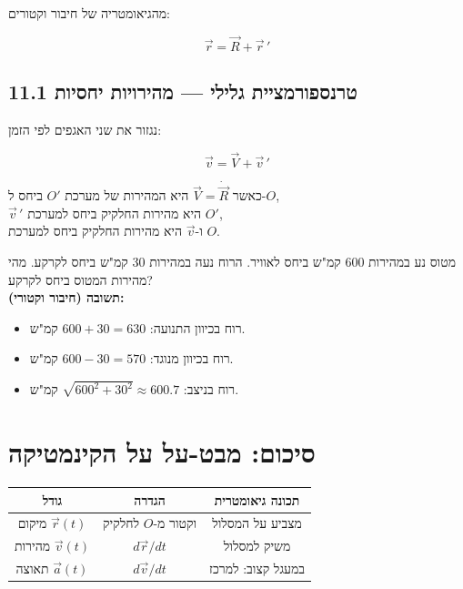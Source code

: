 \documentclass[12pt, a4paper]{article}
\newcommand{\hvec}[1]{\overrightarrow{#1}}
\begin{document}
מהגיאומטריה של חיבור וקטורים:

\begin{tcolorbox}[resultbox]
\[
  \hvec{r} = \hvec{R} + \hvec{r}\,'
\]
\end{tcolorbox}

\subsection*{11.1 טרנספורמציית גלילי --- מהירויות יחסיות}

נגזור את שני האגפים לפי הזמן:

\begin{tcolorbox}[resultbox]
\[
  \hvec{v} = \hvec{V} + \hvec{v}\,'
\]
\end{tcolorbox}

\noindent
כאשר \textenglish{$\hvec{V} = \dot{\hvec{R}}$} היא המהירות של מערכת \textenglish{$O'$} ביחס ל-\textenglish{$O$},\\
\textenglish{$\hvec{v}\,'$} היא מהירות החלקיק ביחס למערכת \textenglish{$O'$},\\
ו-\textenglish{$\hvec{v}$} היא מהירות החלקיק ביחס למערכת \textenglish{$O$}.

\begin{tcolorbox}[notebox, title={דוגמה אינטואיטיבית --- מטוס ורוח}]
מטוס נע במהירות 600 קמ"ש ביחס לאוויר. הרוח נעה במהירות 30 קמ"ש ביחס לקרקע. מהי מהירות המטוס ביחס לקרקע?\\[5pt]
\textbf{תשובה (חיבור וקטורי):}
\begin{itemize}
  \item רוח בכיוון התנועה: \textenglish{$600 + 30 = 630$} קמ"ש.
  \item רוח בכיוון מנוגד: \textenglish{$600 - 30 = 570$} קמ"ש.
  \item רוח בניצב: \textenglish{$\sqrt{600^2 + 30^2} \approx 600.7$} קמ"ש.
\end{itemize}
\end{tcolorbox}

\section*{סיכום: מבט-על על הקינמטיקה}

\begin{tcolorbox}[notebox, title={מושגי יסוד}]
\begin{center}
\begin{tabular}{|c|c|c|}
\hline
\textbf{גודל} & \textbf{הגדרה} & \textbf{תכונה גיאומטרית} \\
\hline
מיקום \textenglish{$\hvec{r}(t)$} & וקטור מ-\textenglish{$O$} לחלקיק & מצביע על המסלול \\
\hline
מהירות \textenglish{$\hvec{v}(t)$} & \textenglish{$d\hvec{r}/dt$} & משיק למסלול \\
\hline
תאוצה \textenglish{$\hvec{a}(t)$} & \textenglish{$d\hvec{v}/dt$} & במעגל קצוב: למרכז \\
\hline
\end{tabular}
\end{center}
\end{tcolorbox}
\end{document}
